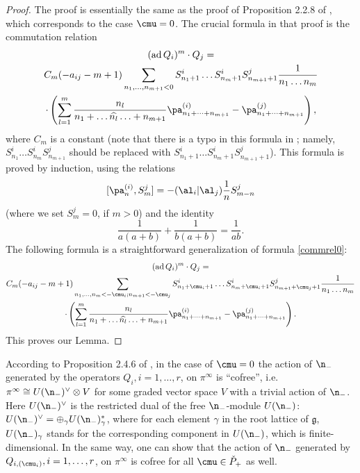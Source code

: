 \documentclass{amsart}
\newcommand{\on}{\operatorname}
\newcommand{\+}{\mathop{\oplus}}
\renewcommand{\*}{{\otimes}}
\newcommand{\mf}{\mathfrak}
\newcommand{\g}{\mf{g}}
\theoremstyle{theorem}
\theoremstyle{remark}
\numberwithin{equation}{section}
\begin{document}
\begin{proof} The proof is essentially the same as the proof of
  Proposition 2.2.8 of \cite{FF93}, which corresponds to the case
  $\cmu=0$. The crucial formula in that proof is the commutation
  relation
\begin{multline}   \label{commrel0}
(\on{ad} Q_i)^m \cdot Q_j = \\ C_m (-a_{ij}-m+1)
\sum_{n_1,\dots,n_{m+1}<0} S^i_{n_1+1} \dots S^i_{n_m+1} S^j_{n_{m+1}+1}
\frac{1}{n_1 \dots n_m} \\ \cdot \left( \sum_{l=1}^m
\frac{n_l}{n_1 + \dots \widehat{n_l} \ldots + n_{m+1}}
\pa^{(i)}_{n_1 + \dots + n_{m+1}} - \pa^{(j)}_{n_1 + \dots +
n_{m+1}} \right),
\end{multline}
where $C_m$ is a constant (note that there is a typo in this formula
in \cite{FF93}; namely, $S^i_{n_1} \dots S^i_{n_m} S^j_{n_{m+1}}$
should be replaced with $S^i_{n_1+1} \dots S^i_{n_m+1}
S^j_{n_{m+1}+1}$). This formula is proved by induction, using the
relations
$$[\pa^{(i)}_n,S^j_m] = - (\al_i|\al_j) \frac{1}{n} S^j_{m-n}$$ (where
we set $S^j_m = 0$, if $m>0$) and the identity
$$\frac{1}{a(a+b)} + \frac{1}{b(a+b)} =
\frac{1}{ab}.$$
The following formula is a straightforward generalization of formula
\eqref{commrel0}:
\begin{multline}   \label{commrelgen}
(\on{ad} Q_i)^m \cdot Q_j = \\ C_m (-a_{ij}-m+1)
\sum_{n_1,\dots,n_m <-\cmu_i; n_{m+1}<-\cmu_j} S^i_{n_1+\cmu_i+1}
\dots S^i_{n_m+\cmu_i+1} S^j_{n_{m+1}+\cmu_j+1}
\frac{1}{n_1 \dots n_m} \\ \cdot \left( \sum_{l=1}^m
\frac{n_l}{n_1 + \dots \widehat{n_l} \ldots + n_{m+1}}
\pa^{(i)}_{n_1 + \dots + n_{m+1}} - \pa^{(j)}_{n_1 + \dots +
n_{m+1}} \right).
\end{multline}
This proves our Lemma.
\end{proof}

According to Proposition 2.4.6 of \cite{FF93}, in the case of $\cmu=0$
the action of $\n_-$ generated by the operators $Q_i, i=1,\dots,r$, on
$\pi^\infty$ is ``cofree'', i.e. $\pi^\infty \cong U(\n_-)^\vee
\otimes V$ for some graded vector space $V$ with a trivial action of
$\n_-$. Here $U(\n_-)^\vee$ is the restricted dual of the free
$\n_-$-module $U(\n_-)$: $U(\n_-)^\vee = \oplus_\gamma
U(\n_-)^*_\gamma$, where for each element $\gamma$ in the root lattice
of $\g$, $U(\n_-)_\gamma$ stands for the corresponding component in
$U(\n_-)$, which is finite-dimensional. In the same way, one can show
that the action of $\n_-$ generated by $Q_{i,(\cmu_i)}, i=1,\dots,r$,
on $\pi^\infty$ is cofree for all $\cmu \in \check{P}_+$ as well.
\end{document}
